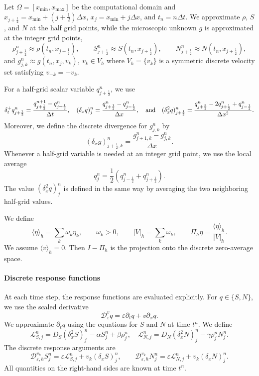 \documentclass[11pt,twoside]{article}
\numberwithin{equation}{section}
\theoremstyle{plain}
\theoremstyle{nonumberplain}
\begin{document}
{{Let $\Omega = [x_{\min}, x_{\max}]$ be the computational domain and \(x_{j+\frac12}=x_{\min}+(j+\frac12)\Delta x\),
\(x_j=x_{\min}+j\Delta x\), and \(t_n=n\Delta t\). We approximate
\(\rho\), \(S\), and \(N\) at the half grid points, while the microscopic
unknown \(g\) is approximated at the integer grid points,
\[
\rho_{j+\frac12}^n\approx \rho(t_n,x_{j+\frac12}),\qquad
S_{j+\frac12}^n\approx S(t_n,x_{j+\frac12}),\qquad
N_{j+\frac12}^n\approx N(t_n,x_{j+\frac12}),
\]
and $
g_{j,k}^n\approx g(t_n,x_j,v_k),\ v_k\in V_h $ where \(V_h=\{v_k\}\) is a symmetric discrete velocity set satisfying 
$v_{-k}=-v_k$.

For a half-grid scalar variable \(q_{j+\frac12}^n\), we use
\[
\delta_t^+ q_{j+\frac12}^n
=
\frac{q_{j+\frac12}^{n+1}-q_{j+\frac12}^n}{\Delta t},
\ \ \
(\delta_x q)_j^n
=
\frac{q_{j+\frac12}^n-q_{j-\frac12}^n}{\Delta x},\ \ \ \textnormal{and}\ \ \
(\delta_x^2 q)_{j+\frac12}^n
=
\frac{
q_{j+\frac32}^n
-2q_{j+\frac12}^n
+q_{j-\frac12}^n
}{\Delta x^2}.
\]
Moreover, we define the discrete divergence for \(g_{j,k}^n\) by
\[
(\delta_x g)_{j+\frac12,k}^n
=
\frac{g_{j+1,k}^n-g_{j,k}^n}{\Delta x}.
\]
Whenever a half-grid variable is needed at an integer grid point, we use
the local average
\[
q_j^n=\frac12\left(q_{j-\frac12}^n+q_{j+\frac12}^n\right).
\]
The value \((\delta_x^2 q)_j^n\) is defined in the same way by averaging
the two neighboring half-grid values.


We define
\[
\langle \eta\rangle_h=\sum_{k}\omega_k\eta_k,
\qquad \omega_k>0,
\qquad |V|_h=\sum_{k}\omega_k,
\qquad \Pi_h\eta=\frac{\langle\eta\rangle_h}{|V|_h}.
\]
We assume $\langle v\rangle_h=0$. Then $I-\Pi_h$ is the
projection onto the discrete zero-average space.


\paragraph{Discrete response functions}

At each time step, the response functions are evaluated explicitly. 
For $q\in\{S,N\}$, we use the scaled derivative
\begin{equation}
\mathcal D_\varepsilon^v q
=\varepsilon\partial_tq+v\partial_xq.
\end{equation}
We approximate $\partial_tq$ using the equations for \(S\) and
\(N\) at time $t^n$. 
We define
\[
\mathcal L_{S,j}^n
=
 D_S(\delta_x^2 S)_j^n
-\alpha S_j^n
+\beta \rho_j^n,
\quad 
\mathcal L_{N,j}^n
=
 D_N(\delta_x^2 N)_j^n
-\gamma \rho_j^n N_j^n .
\]
The discrete response arguments are
\[
\mathcal D_{\varepsilon,h}^{v_k}S_j^n
=\varepsilon\mathcal L_{S,j}^n+v_k(\delta_xS)_j^n,
\qquad
\mathcal D_{\varepsilon,h}^{v_k}N_j^n
=\varepsilon\mathcal L_{N,j}^n+v_k(\delta_xN)_j^n.
\]
All quantities on the right-hand sides are known at time $t^n$.

}}
\end{document}
